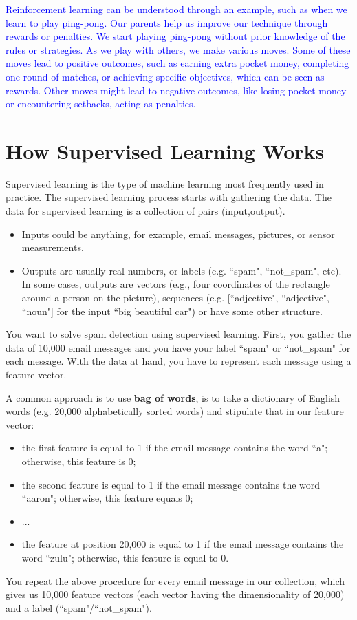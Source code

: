 \textcolor{blue}{Reinforcement learning can be understood through an example, such as when we learn to play ping-pong. Our parents help us improve our technique through rewards or penalties. We start playing ping-pong without prior knowledge of the rules or strategies. As we play with others, we make various moves. Some of these moves lead to positive outcomes, such as earning extra pocket money, completing one round of matches, or achieving specific objectives, which can be seen as rewards. Other moves might lead to negative outcomes, like losing pocket money or encountering setbacks, acting as penalties.
}


\section{How Supervised Learning Works}
Supervised learning is the type of machine learning most frequently used in practice. The supervised learning process starts with gathering the data. The data for supervised learning is a collection of pairs (input,output).
\begin{itemize}
	\item Inputs could be anything, for example, email messages, pictures, or sensor measurements.
	\item Outputs are usually real numbers, or labels (e.g. ``spam", ``not\_spam", etc). In some cases, outputs are vectors (e.g., four coordinates of the rectangle around a person on the picture), sequences (e.g. [``adjective", ``adjective", ``noun"] for the input ``big beautiful car") or have some other structure.
\end{itemize}
You want to solve spam detection using supervised learning. First, you gather the data of 10,000 email messages and you have your label ``spam" or ``not\_spam" for each message. With the data at hand, you have to represent each message using a feature vector.

A common approach is to use \textbf{bag of words}, is to take a dictionary of English words (e.g. 20,000 alphabetically sorted words) and stipulate that in our feature vector:
\begin{itemize}
	\item the first feature is equal to 1 if the email message contains the word ``a"; otherwise, this feature is 0;
	\item the second feature is equal to 1 if the email message contains the word ``aaron"; otherwise, this feature equals 0;
	\item ...
	\item the feature at position 20,000 is equal to 1 if the email message contains the word ``zulu"; otherwise, this feature is equal to 0.
\end{itemize}
You repeat the above procedure for every email message in our collection, which gives us 10,000 feature vectors (each vector having the dimensionality of 20,000) and a label (``spam"/``not\_spam").

